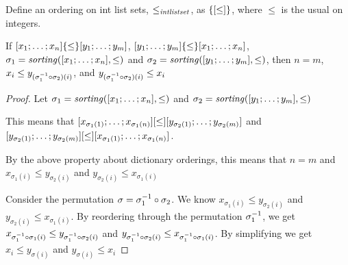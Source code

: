 \documentclass[acmsmall]{acmart}
\begin{document}
\begin{definition}
  Define an ordering on int list sets, $\leq_{\mathit{intlistset}}$, as
  $\{ [ \leq ] \}$, where $\leq$ is the usual on
  integers.
\end{definition}

\begin{lemma}
  \label{lem:spec-set-list-perm}
  If 
  $[ x_1;\ldots;x_n ] \{ \leq \} [ y_1;\ldots;y_m ]$,
  $[ y_1;\ldots;y_m ] \{ \leq \} [ x_1;\ldots;x_n ]$,
  $\sigma_1 = \mathit{sorting}([ x_1;\ldots;x_n ],\leq)$ and
  $\sigma_2 = \mathit{sorting}([ y_1;\ldots;y_m ],\leq)$, then
  $n = m$,
  $x_i \leq y_{(\sigma_1^{-1} \circ \sigma_2)(i)}$, and
  $y_{(\sigma_1^{-1} \circ \sigma_2)(i)} \leq x_i$
\end{lemma}
\begin{proof}
    Let $\sigma_1 = \mathit{sorting}([ x_1;\ldots;x_n ],\leq)$ and
    $\sigma_2 = \mathit{sorting}([ y_1;\ldots;y_m ],\leq)$
    
    This means that
    $[ x_{\sigma_1(1)};\ldots;x_{\sigma_1(n)} ] [ \leq ]
    [ y_{\sigma_2(1)};\ldots;y_{\sigma_2(m)} ]$ and
    $[ y_{\sigma_2(1)};\ldots;y_{\sigma_2(m)} ] [ \leq ]
    [ x_{\sigma_1(1)};\ldots;x_{\sigma_1(n)} ]$.

    By the above property about dictionary orderings, this means that $n=m$ and
    $x_{\sigma_1(i)} \leq y_{\sigma_2(i)}$ and $y_{\sigma_2(i)} \leq
    x_{\sigma_1(i)}$

    Consider the permutation $\sigma = \sigma_1^{-1} \circ \sigma_2$.
    We know $x_{\sigma_1(i)} \leq y_{\sigma_2(i)}$ and $y_{\sigma_2(i)} \leq
    x_{\sigma_1(i)}$.  By reordering through the permutation
    $\sigma_1^{-1}$, we get $x_{\sigma_1^{-1} \circ \sigma_1(i)}
    \leq y_{\sigma_1^{-1} \circ \sigma_2(i)}$ and
    $y_{\sigma_1^{-1} \circ \sigma_2(i)} \leq 
    x_{\sigma_1^{-1} \circ \sigma_1(i)}$.  By simplifying we get
    $x_i
    \leq y_{\sigma(i)}$ and
    $y_{\sigma(i)} \leq x_{i}$
\end{proof}
\end{document}
